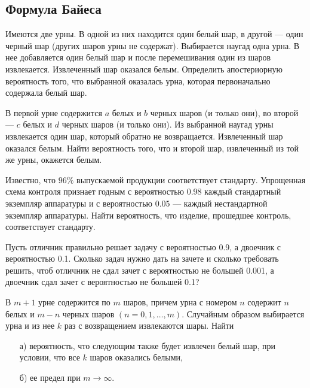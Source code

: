 \subsection{Формула Байеса}


\begin{problem}
Имеются две урны. В одной из них находится один белый шар, в другой --- один черный шар (других шаров урны не содержат). Выбирается 
наугад одна урна. В нее добавляется один белый шар и после перемешивания один из шаров извлекается. Извлеченный шар оказался белым. 
Определить апостериорную вероятность того, что выбранной оказалась урна, которая первоначально содержала белый шар. 
\end{problem}


\begin{problem}
В первой урне содержится $a$ белых и $b$ черных шаров (и только они), во второй --- $c$ белых и $d$ черных шаров 
(и только они). Из выбранной наугад урны извлекается один шар, который обратно не возвращается. Извлеченный шар оказался белым. 
Найти вероятность того, что и второй шар, извлеченный из той же урны, окажется белым. 
\end{problem}


\begin{problem}
Известно, что $96\%$ выпускаемой продукции соответствует стандарту. Упрощенная схема контроля признает годным с вероятностью 
$0.98$ каждый стандартный экземпляр аппаратуры и с вероятностью $0.05$ --- каждый нестандартной экземпляр аппаратуры. Найти вероятность, 
что изделие, прошедшее контроль, соответствует стандарту. 
\end{problem}


\begin{problem}
Пусть отличник правильно решает задачу с вероятностью 0.9, а двоечник с вероятностью 0.1. Сколько задач нужно дать на зачете и сколько требовать решить, чтоб отличник не сдал зачет с вероятностью не большей 0.001, а двоечник сдал зачет с вероятностью не большей 0.1?
\end{problem}

\begin{problem}
В $m+1$ урне содержится по $m$ шаров, причем урна с номером $n$ содержит $n$ белых и $m-n$ черных шаров $(n = 0,1,\ldots,m)$. 
Случайным образом выбирается урна и из нее $k$ раз с возвращением извлекаются шары. Найти 
\begin{enumerate}
\item[а)] вероятность, что следующим также будет извлечен белый шар, при условии, что все $k$ шаров оказались белыми, 
\item[б)] ее предел при $m\to\infty$. 
\end{enumerate}
\end{problem}

